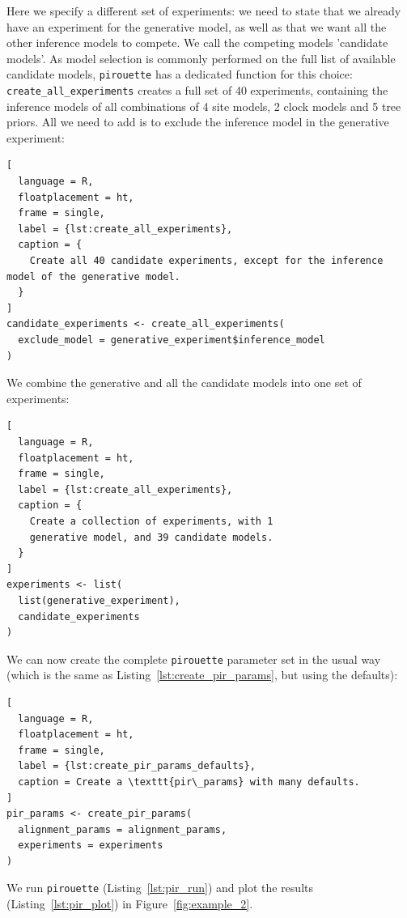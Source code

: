 Here we specify a different set of experiments: we
need to state that we already have an experiment for
the generative model, as well as that we want all the other inference models to compete. We call the competing models 'candidate models'.
As model selection is commonly performed on the full list of available candidate models, \verb;pirouette; has a dedicated function for this choice: \verb;create_all_experiments; creates a full set of 40 experiments, containing the inference models of all combinations of 4 site models, 2 clock models and 5 tree priors. All we need to add is to exclude the inference model in the generative experiment:

\begin{lstlisting}[
  language = R, 
  floatplacement = ht, 
  frame = single, 
  label = {lst:create_all_experiments},
  caption = {
    Create all 40 candidate experiments, except for the inference model of the generative model.
  }
]
candidate_experiments <- create_all_experiments(
  exclude_model = generative_experiment$inference_model
)
\end{lstlisting}

We combine the generative and all the candidate models into one set of experiments:

\begin{lstlisting}[
  language = R, 
  floatplacement = ht, 
  frame = single, 
  label = {lst:create_all_experiments},
  caption = {
    Create a collection of experiments, with 1
    generative model, and 39 candidate models.
  }
]
experiments <- list(
  list(generative_experiment),
  candidate_experiments
)
\end{lstlisting}

We can now create the complete \verb;pirouette; parameter set in the usual way (which is the same as Listing~\ref{lst:create_pir_params}, but using the defaults):

\begin{lstlisting}[
  language = R,
  floatplacement = ht,
  frame = single,
  label = {lst:create_pir_params_defaults},
  caption = Create a \texttt{pir\_params} with many defaults.
]
pir_params <- create_pir_params(
  alignment_params = alignment_params,
  experiments = experiments
)
\end{lstlisting}

We run \verb;pirouette; (Listing~\ref{lst:pir_run}) 
and plot the results (Listing~\ref{lst:pir_plot}) in Figure~\ref{fig:example_2}.

